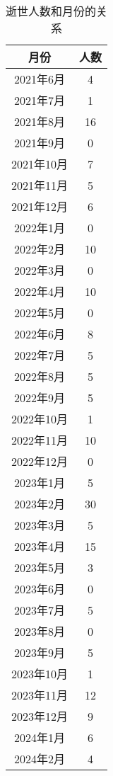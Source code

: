 \documentclass[twocolumn]{article}
\begin{document}
\begin{table}[!ht]
    \centering
    \begin{tabular}{c|c}
        \textbf{月份} & \textbf{人数} \\ \hline
        2021年6月     & 4             \\
        2021年7月     & 1             \\
        2021年8月     & 16            \\
        2021年9月     & 0             \\
        2021年10月    & 7             \\
        2021年11月    & 5             \\
        2021年12月    & 6             \\
        2022年1月     & 0             \\
        2022年2月     & 10            \\
        2022年3月     & 0             \\
        2022年4月     & 10            \\
        2022年5月     & 0             \\
        2022年6月     & 8             \\
        2022年7月     & 5             \\
        2022年8月     & 5             \\
        2022年9月     & 5             \\
        2022年10月    & 1             \\
        2022年11月    & 10            \\
        2022年12月    & 0             \\
        2023年1月     & 5             \\
        2023年2月     & 30            \\
        2023年3月     & 5             \\
        2023年4月     & 15            \\
        2023年5月     & 3             \\
        2023年6月     & 0             \\
        2023年7月     & 5             \\
        2023年8月     & 0             \\
        2023年9月     & 5             \\
        2023年10月    & 1             \\
        2023年11月    & 12            \\
        2023年12月    & 9             \\
        2024年1月     & 6             \\
        2024年2月     & 4             \\
    \end{tabular}    
    \caption{逝世人数和月份的关系}

\end{table}
\end{document}
